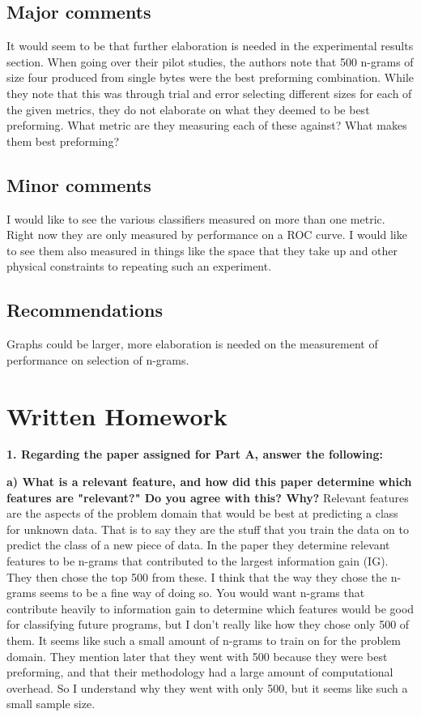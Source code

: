 \documentclass[11pt, oneside]{article}   	%
\begin{document}
\subsection{Major comments}
It would seem to be that further elaboration is needed in the experimental results section. When going over their pilot studies, the authors note that 500 n-grams of size four produced from single bytes were the best preforming combination. While they note that this was through trial and error selecting different sizes for each of the given metrics, they do not elaborate on what they deemed to be best preforming. What metric are they measuring each of these against? What makes them best preforming?

\subsection{Minor comments}
I would like to see the various classifiers measured on more than one metric. Right now they are only measured by performance on a ROC curve. I would like to see them also measured in things like the space that they take up and other physical constraints to repeating such an experiment. 

\subsection{Recommendations}
Graphs could be larger, more elaboration is needed on the measurement of performance on selection of n-grams. 
\section{Written Homework}

\textbf{1. Regarding the paper assigned for Part A, answer the following:}
	
	\textbf{a) What is a relevant feature, and how did this paper determine which features are "relevant?" Do you agree with 
	this? Why?}
	Relevant features are the aspects of the problem domain that would be best at predicting a class for unknown data. That is to say they are the stuff that you train the data on to predict the class of a new piece of data. In the paper they determine relevant features to be n-grams that contributed to the largest information gain (IG). They then chose the top 500 from these. I think that the way they chose the n-grams seems to be a fine way of doing so. You would want n-grams that contribute heavily to information gain to determine which features would be good for classifying future programs, but I don't really like how they chose only 500 of them. It seems like such a small amount of n-grams to train on for the problem domain. They mention later that they went with 500 because they were best preforming, and that their methodology had a large amount of computational overhead. So I understand why they went with only 500, but it seems like such a small sample size. 
	
\end{document}
